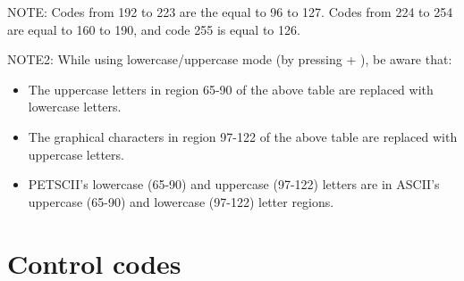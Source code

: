 NOTE: Codes from 192 to 223 are the equal to 96 to 127. Codes from 224 to 254 are equal to 160 to 190,
and code 255 is equal to 126.

NOTE2: While using lowercase/uppercase mode (by pressing \megasymbolkey + ), be aware that:
\begin{itemize}
  \item The uppercase letters in region 65-90 of the above table are replaced with lowercase letters.
  \item The graphical characters in region 97-122 of the above table are replaced with uppercase letters.
  \item PETSCII's lowercase (65-90) and uppercase (97-122) letters are in ASCII's uppercase (65-90) and lowercase (97-122) letter regions.
\end{itemize}


\section{Control codes}
\label{appendix:controlcodes}

